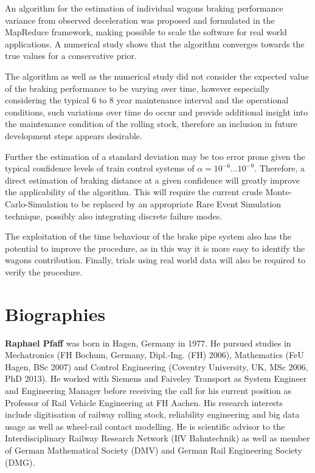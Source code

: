 \documentclass[a4paper, 12pt]{scrartcl}
\begin{document}
An algorithm for the estimation of individual wagons braking performance variance from observed deceleration was proposed and formulated in the MapReduce framework, making possible to scale the software for real world applications. A numerical study shows that the algorithm converges towards the true values for a conservative prior.

The algorithm as well as the numerical study did not consider the expected value of the braking performance to be varying over time, however especially considering the typical 6 to 8 year maintenance interval and the operational conditions, such variations over time do occur and provide additional insight into the maintenance condition of the rolling stock, therefore an inclusion in future development steps appears desirable.

Further the estimation of a standard deviation may be too error prone given the typical confidence levels of train control systems of $\alpha = 10^{-6} \ldots 10^{-9}$. Therefore, a direct estimation of braking distance at a given confidence will greatly improve the applicability of the algorithm. This will require the current crude Monte-Carlo-Simulation to be replaced by an appropriate Rare Event Simulation technique, possibly also integrating discrete failure modes.

The exploitation of the time behaviour of the brake pipe system also has the potential to improve the procedure, as in this way it is more easy to identify the wagons contribution. Finally, trials using real world data will also be required to verify the procedure.





\section*{Biographies}


\noindent\textbf{Raphael Pfaff} was born in Hagen, Germany in 1977. He pursued studies in Mechatronics (FH Bochum, Germany, Dipl.-Ing. (FH) 2006), Mathematics (FeU Hagen, BSc 2007) and Control Engineering (Coventry University, UK, MSc 2006, PhD 2013). He worked with Siemens and Faiveley Transport as System Engineer and Engineering Manager before receiving the call for his current position as Professor of Rail Vehicle Engineering at FH Aachen. His research interests include digitisation of railway rolling stock, reliability engineering and big data usage as well as wheel-rail contact modelling. He is scientific advisor to the Interdisciplinary Railway Research Network (IfV Bahntechnik) as well as  member of German Mathematical Society (DMV) and German Rail Engineering Society (DMG).




%
\end{document}
